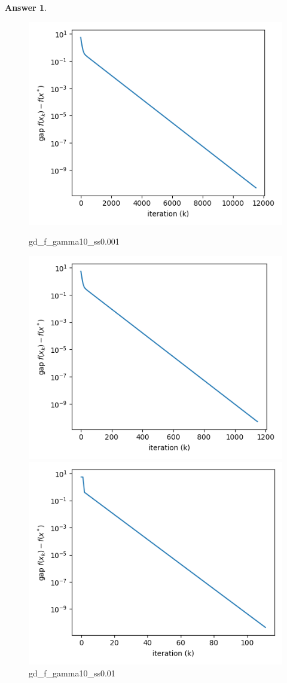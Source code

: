 \documentclass{article}
\theoremstyle{definition}
\newtheorem{ans}{Answer}
\begin{document}
\begin{ans}
\begin{enumerate}[(a)]
			\begin{figure}
				\begin{minipage}[t]{0.48\textwidth}
					\centering
					\includegraphics[width=0.7\linewidth]{../figures/gd_f_gamma10_ss0.001}
					\caption{gd\_f\_gamma10\_ss0.001}
				\end{minipage}
				\begin{minipage}[t]{0.48\textwidth}
					\centering
					\includegraphics[width=0.7\linewidth]{../figures/gd_f_gamma10_ss0.01}
					\caption{gd\_f\_gamma10\_ss0.01}
				\end{minipage}
				\begin{minipage}[t]{0.48\textwidth}
					\centering
					\includegraphics[width=0.7\linewidth]{../figures/gd_f_gamma10_ss0.1}

\end{minipage}
\end{figure}
\end{enumerate}
\end{ans}
\end{document}
